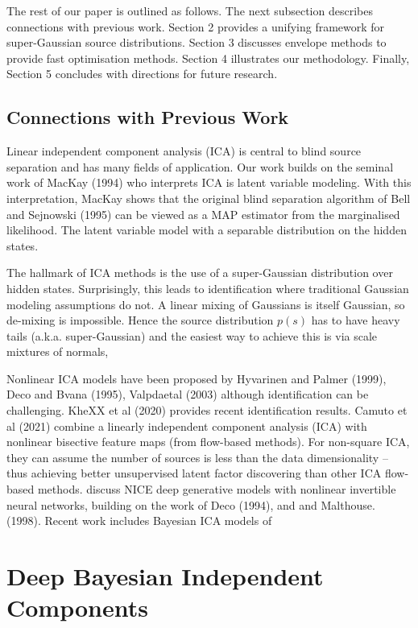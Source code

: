 \documentclass[11pt]{article}%
\begin{document}
The rest of our paper is outlined as follows. The next subsection describes connections with previous work. Section 2 provides a unifying framework for super-Gaussian source distributions. Section 3 discusses envelope methods to provide fast optimisation methods. Section 4 illustrates our methodology. Finally, Section 5 concludes with directions for future research. 

\subsection{Connections with Previous Work}

Linear independent component analysis (ICA) is central to blind source separation and has many fields of application.
Our work builds on the seminal work of MacKay (1994) who interprets ICA is latent variable modeling. With this interpretation, MacKay shows that the original blind separation algorithm of Bell and  Sejnowski (1995) can be viewed as a MAP estimator from the marginalised likelihood. 
The latent variable model with a separable distribution on
the hidden states. 

The hallmark of ICA methods is the use of a super-Gaussian distribution over hidden states. Surprisingly, this leads to identification where traditional Gaussian modeling assumptions do not.  A linear mixing of Gaussians is itself Gaussian, so de-mixing is impossible. Hence the source distribution $p(s)$ has to have heavy tails (a.k.a. super-Gaussian) and the easiest way to achieve this is  via scale mixtures of normals, 

Nonlinear ICA models have been proposed by Hyvarinen and Palmer (1999), Deco and Bvana (1995), Valpdaetal (2003) although identification can be challenging. KheXX et al (2020) provides recent identification results.
Camuto et al (2021) combine a linearly independent component analysis (ICA) with nonlinear bisective feature maps (from flow-based methods). For non-square ICA, they can assume the number of sources is less than the data dimensionality -- thus achieving better unsupervised latent factor discovering than other ICA flow-based methods. 
\citet{dinh2014nice} discuss NICE deep generative models with nonlinear invertible neural networks, building on the work of Deco (1994), \citet{comon1991blind} and \citet{pearlmutter1996context} and Malthouse. (1998).
Recent work includes Bayesian ICA models of  \citep{donnat2019constrained}

\section{Deep Bayesian Independent Components}
\end{document}

